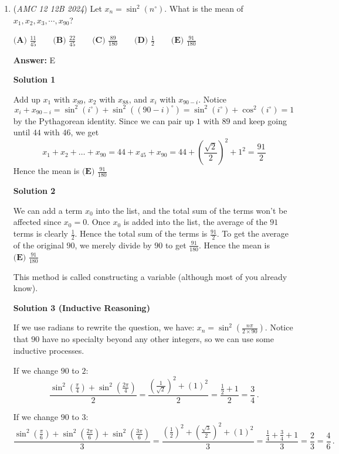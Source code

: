 \begin{enumerate}
 


	\item (\textit{AMC 12 12B 2024}) Let $x_{n} = \sin^2(n^\circ)$. What is the mean of $x_{1}, x_{2}, x_{3}, \cdots, x_{90}$?


 $\textbf{(A) }\frac{11}{45} \qquad \textbf{(B) }\frac{22}{45} \qquad \textbf{(C) }\frac{89}{180} \qquad \textbf{(D) }\frac{1}{2} \qquad \textbf{(E) }\frac{91}{180} \qquad$

 \textbf{Answer: }E



\textbf{Solution 1}

Add up $x_1$ with $x_{89}$, $x_2$ with $x_{88}$, and $x_i$ with $x_{90-i}$. Notice
 \[x_i+x_{90-i}=\sin^2(i^{\circ})+\sin^2((90-i)^{\circ})=\sin^2(i^{\circ})+\cos^2(i^{\circ})=1\]by the Pythagorean identity. Since we can pair up $1$ with $89$ and keep going until $44$ with $46$, we get
 \[x_1+x_2+\dots+x_{90}=44+x_{45}+x_{90}=44+\left(\frac{\sqrt{2}}{2}\right)^2+1^2=\frac{91}{2}\]Hence the mean is $\boxed{\textbf{(E) }\frac{91}{180}}$




\textbf{Solution 2}

We can add a term $x_0$ into the list, and the total sum of the terms won't be affected since $x_0=0$. Once $x_0$ is added into the list, the average of the $91$ terms is clearly $\frac{1}{2}$. Hence the total sum of the terms is $\frac{91}{2}$. To get the average of the original $90$, we merely divide by $90$ to get $\frac{91}{180}$. Hence the mean is $\boxed{\textbf{(E) }\frac{91}{180}}$

 This method is called constructing a variable (although most of you already know). 

 



\textbf{Solution 3 (Inductive Reasoning)}

If we use radians to rewrite the question, we have: $x_n=\sin^2\left(\frac{n\pi}{2\times90}\right)$. Notice that $90$ have no specialty beyond any other integers, so we can use some inductive processes.

 If we change $90$ to $2$: 
 \[\frac{\sin^2\left(\frac{\pi}{4}\right)+\sin^2\left(\frac{2\pi}{4}\right)}{2}=\frac{\left(\frac{1}{\sqrt{2}}\right)^2+\left(1\right)^2}{2}=\frac{\frac{1}{2}+1}{2}=\frac{3}{4}\,.\]

 If we change $90$ to $3$: 
 \[\frac{\sin^2\left(\frac{\pi}{6}\right)+\sin^2\left(\frac{2\pi}{6}\right)+\sin^2\left(\frac{3\pi}{6}\right)}{3}=\frac{\left(\frac{1}{2}\right)^2+\left(\frac{\sqrt{3}}{2}\right)^2+\left(1\right)^2}{3}=\frac{\frac{1}{4}+\frac{3}{4}+1}{3}=\frac{2}{3}=\frac{4}{6}\,.\]


\end{enumerate}
